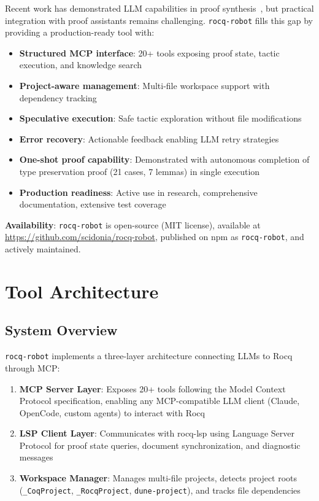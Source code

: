 \documentclass[11pt,a4paper]{article}
\newcommand{\tool}{\texttt{rocq-robot}\xspace}
\begin{document}
Recent work has demonstrated LLM capabilities in proof synthesis~\cite{first2023baldur,yang2023leandojo}, but practical integration with proof assistants remains challenging. \tool fills this gap by providing a production-ready tool with:

\begin{itemize}
\item \textbf{Structured MCP interface}: 20+ tools exposing proof state, tactic execution, and knowledge search
\item \textbf{Project-aware management}: Multi-file workspace support with dependency tracking
\item \textbf{Speculative execution}: Safe tactic exploration without file modifications
\item \textbf{Error recovery}: Actionable feedback enabling LLM retry strategies
\item \textbf{One-shot proof capability}: Demonstrated with autonomous completion of type preservation proof (21 cases, 7 lemmas) in single execution
\item \textbf{Production readiness}: Active use in research, comprehensive documentation, extensive test coverage
\end{itemize}

\textbf{Availability}: \tool is open-source (MIT license), available at \url{https://github.com/scidonia/rocq-robot}, published on npm as \texttt{rocq-robot}, and actively maintained.

\section{Tool Architecture}

\subsection{System Overview}

\tool implements a three-layer architecture connecting LLMs to Rocq through MCP:

\begin{enumerate}
\item \textbf{MCP Server Layer}: Exposes 20+ tools following the Model Context Protocol specification, enabling any MCP-compatible LLM client (Claude, OpenCode, custom agents) to interact with Rocq
\item \textbf{LSP Client Layer}: Communicates with rocq-lsp using Language Server Protocol for proof state queries, document synchronization, and diagnostic messages
\item \textbf{Workspace Manager}: Manages multi-file projects, detects project roots (\texttt{\_CoqProject}, \texttt{\_RocqProject}, \texttt{dune-project}), and tracks file dependencies
\end{enumerate}
\end{document}

